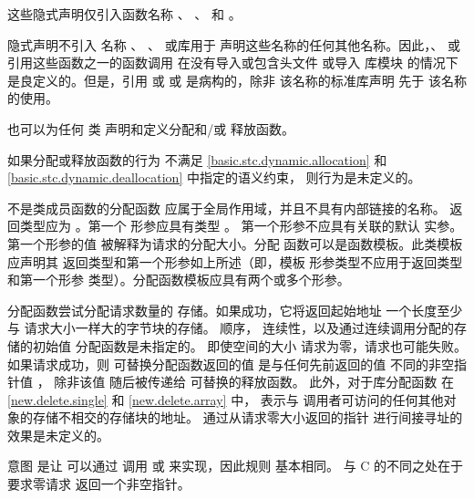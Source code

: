 这些隐式声明仅引入函数名称
、
、
 和
。
\begin{note}
隐式声明不引入
名称 、
、
或库用于
声明这些名称的任何其他名称。因此，、
 或引用这些函数之一的函数调用
在没有导入或包含头文件 
或导入 \Cpp{} 库模块 的情况下
是良定义的。但是，引用 
或 
或 
是病构的，除非
该名称的标准库声明
先于 该名称的使用。
\end{note}
也可以为任何
类 声明和定义分配和/或
释放函数。

\pnum
如果分配或释放函数的行为
不满足 \ref{basic.stc.dynamic.allocation}
和 \ref{basic.stc.dynamic.deallocation} 中指定的语义约束，
则行为是未定义的。


\pnum
{}%
不是类成员函数的分配函数
应属于全局作用域，并且不具有内部链接的名称。
返回类型应为 。第一个
形参应具有类型 。
第一个形参不应具有关联的默认
实参。第一个形参的值
被解释为请求的分配大小。分配
函数可以是函数模板。此类模板应声明其
返回类型和第一个形参如上所述（即，模板
形参类型不应用于返回类型和第一个形参
类型）。分配函数模板应具有两个或多个形参。

\pnum
分配函数尝试分配请求数量的
存储。如果成功，它将返回起始地址
一个长度至少与
请求大小一样大的字节块的存储。
顺序，
连续性，以及通过连续调用分配的存储的初始值
分配函数是未指定的。
即使空间的大小
请求为零，请求也可能失败。如果请求成功，则
可替换分配函数返回的值
是与任何先前返回的值  不同的非空指针值
，
除非该值  随后被传递给
可替换的释放函数。
此外，对于库分配函数
在 \ref{new.delete.single} 和 \ref{new.delete.array} 中，
 表示与
调用者可访问的任何其他对象的存储不相交的存储块的地址。
通过从请求零大小返回的指针
进行间接寻址的效果是未定义的。
\begin{footnote}
意图
是让  可以通过
调用  或  来实现，因此规则
基本相同。\Cpp{} 与 C 的不同之处在于要求零请求
返回一个非空指针。
\end{footnote}

